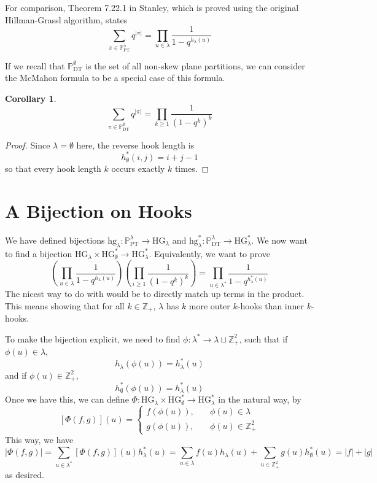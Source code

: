 \documentclass{amsart}
\newcommand{\pt}[1]{\mathbb{P}_\mathrm{PT}^{#1}}
\newcommand{\dt}[1]{\mathbb{P}_\mathrm{DT}^{#1}}
\newcommand{\ZZ}{\mathbb{Z}}
\newcommand{\HG}[1]{\mathrm{HG}_{#1}}
\newcommand{\hg}[1]{\mathrm{hg}_{#1}}
\newtheorem{corollary}{Corollary}
\theoremstyle{definition}
\begin{document}
For comparison, Theorem 7.22.1 in Stanley, which is proved using the
original Hillman-Grassl algorithm, states
\[
  \sum_{\pi \in \pt{\lambda}} q^{|\pi|} =
  \prod_{u \in \lambda} \frac{1}{1 - q^{h_\lambda(u)}}
\]

If we recall that $\dt{\emptyset}$ is the set of all non-skew plane
partitions, we can consider the McMahon formula to be a special case
of this formula.
\begin{corollary}
\[
  \sum_{\pi \in \dt{\emptyset}} q^{|\pi|} =
  \prod_{k \geq 1} \frac{1}{\left(1 - q^k\right)^k}
\]
\end{corollary}
\begin{proof}
  Since $\lambda = \emptyset$ here, the reverse hook length is
  \[
    h_\emptyset^*(i, j) = i + j - 1
  \]
  so that every hook length $k$ occurs exactly $k$ times.
\end{proof}

\section{A Bijection on Hooks}
We have defined bijections $\hg{\lambda} : \pt{\lambda} \to
\HG{\lambda}$ and $\hg{\lambda}^* : \dt{\lambda} \to \HG{\lambda}^*$.
We now want to find a bijection $\HG{\lambda} \times \HG{\emptyset}^*
\to \HG{\lambda}^*$.  Equivalently, we want to prove
\[
  \left(\prod_{u \in \lambda} \frac{1}{1-q^{h_\lambda(u)}}\right)
  \left(\prod_{i \geq 1} \frac{1}{(1-q^k)^k}\right) =
  \prod_{u \in \lambda^*} \frac{1}{1-q^{h_\lambda^*(u)}}
\]
The nicest way to do with would be to directly match up terms in the
product.  This means showing that for all $k \in \ZZ_+$, $\lambda$ has
$k$ more outer $k$-hooks than inner $k$-hooks.  

To make the bijection explicit, we need to find
$\phi: \lambda^* \to \lambda \sqcup \ZZ_+^2$, such that if
$\phi(u) \in \lambda$,
\[ h_\lambda(\phi(u)) = h_\lambda^*(u) \]
and if $\phi(u) \in \ZZ_+^2$,
\[ h_\emptyset^*(\phi(u)) = h_\lambda^*(u) \]
Once we have this, we can define $\Phi : \HG{\lambda} \times
\HG{\emptyset}^* \to \HG{\lambda}^*$ in the natural way, by
\[ 
  [\Phi(f, g)](u) = \begin{cases}
    f(\phi(u)), &\quad \phi(u) \in \lambda \\
    g(\phi(u)), &\quad \phi(u) \in \ZZ_+^2
  \end{cases}
\]
This way, we have
\[
  |\Phi(f, g)| =
  \sum_{u \in \lambda^*} [\Phi(f, g)](u)h_\lambda^*(u) =
  \sum_{u \in \lambda} f(u)h_\lambda(u) + 
  \sum_{u \in \ZZ_+^2} g(u)h_\emptyset^*(u) =
  |f| + |g|
\]
as desired.
\end{document}
